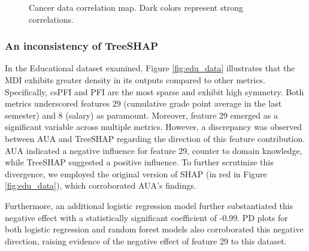 \begin{figure}[ht!]
\centering
  \caption{Cancer data correlation map. Dark colors represent strong correlations.}
    \label{fig:correlation}
\end{figure}


\subsubsection{An inconsistency of TreeSHAP}

In the Educational dataset examined, Figure \ref{fig:edu_data} illustrates that the \gls{MDI} exhibits greater density in its outputs compared to other metrics. Specifically, \gls{csPFI} and \gls{PFI} are the most sparse and exhibit high symmetry. Both metrics underscored features 29 (cumulative grade point average in the last semester) and 8 (salary) as paramount. Moreover, feature 29 emerged as a significant variable across multiple metrics. However, a discrepancy was observed between \gls{AUA} and TreeSHAP regarding the direction of this feature contribution. \gls{AUA} indicated a negative influence for feature 29, counter to domain knowledge, while TreeSHAP suggested a positive influence. To further scrutinize this divergence, we employed the original version of \gls{SHAP} (in red in Figure \ref{fig:edu_data}), which corroborated \gls{AUA}'s findings.

Furthermore, an additional logistic regression model further substantiated this negative effect with a statistically significant coefficient of -0.99. \gls{PD} plots for both logistic regression and random forest models also corroborated this negative direction, raising evidence of the negative effect of feature 29 to this dataset. 

